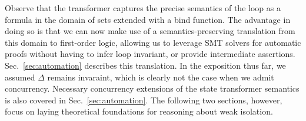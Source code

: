 Observe that the transformer captures the precise semantics of the
loop as a formula in the domain of sets extended with a bind
function. The advantage in doing so is that we can now make use of a
semantics-preserving translation from this domain to first-order
logic, allowing us to leverage SMT solvers for automatic proofs
without having to infer loop invariant, or provide intermediate
assertions.  Sec.~\ref{sec:automation} describes this translation. In
the exposition thus far, we assumed $\Delta$ remains invaraint, which
is clearly not the case when we admit concurrency.  Necessary
concurrency extensions of the state transformer semantics is also
covered in Sec.~\ref{sec:automation}.  The following two sections,
however, focus on laying theoretical foundations for reasoning about
weak isolation.
